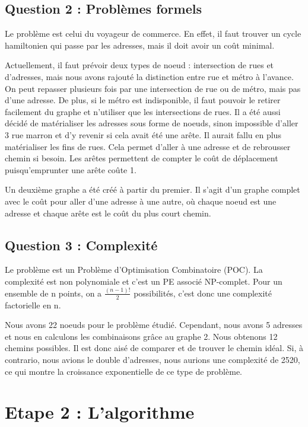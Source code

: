     \clearpage


  \subsection{Question 2 : Problèmes formels}
    Le problème est celui du voyageur de commerce. En effet, il faut trouver un cycle hamiltonien qui passe par les adresses, mais il doit avoir un coût minimal.

    Actuellement, il faut prévoir deux types de noeud : intersection de rues et d'adresses, mais nous avons rajouté la distinction entre rue et métro à l'avance. On peut repasser plusieurs fois par une intersection de rue ou de métro, mais pas d'une adresse. De plus, si le métro est indisponible, il faut pouvoir le retirer facilement du graphe et n'utiliser que les intersections de rues. Il a été aussi décidé de matérialiser les adresses sous forme de noeuds, sinon impossible d'aller 3 rue marron et d'y revenir si cela avait été une arête. Il aurait fallu en plus matérialiser les fins de rues. Cela permet d'aller à une adresse et de rebrousser chemin si besoin.
    Les arêtes permettent de compter le coût de déplacement puisqu'emprunter une arête coûte 1.

    Un deuxième graphe a été créé à partir du premier. Il s'agit d'un graphe complet avec le coût pour aller d'une adresse à une autre, où chaque noeud est une adresse et chaque arête est le coût du plus court chemin.

  \subsection{Question 3 : Complexité}
    Le problème est un Problème d'Optimisation Combinatoire (POC). La complexité est non polynomiale et c'est un PE associé NP-complet.
    Pour un ensemble de n points, on a $\frac{(n-1)!}{2}$ possibilités, c'est donc une complexité factorielle en n.

    Nous avons 22 noeuds pour le problème étudié. Cependant, nous avons 5 adresses et nous en calculons les combinaisons grâce au graphe 2. Nous obtenons 12 chemins possibles. Il est donc aisé de comparer et de trouver le chemin idéal. Si, à contrario, nous avions le double d'adresses, nous aurions une complexité de 2520, ce qui montre la croissance exponentielle de ce type de problème.

    \newpage


\section{Etape 2 : L'algorithme}

